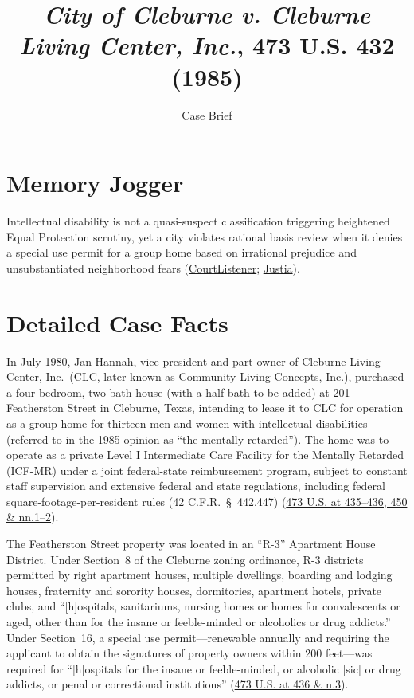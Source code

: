 \documentclass[12pt]{article}
\title{\textit{City of Cleburne v. Cleburne Living Center, Inc.}, 473 U.S. 432 (1985)}
\subtitle{Case Brief}
\author{}
\date{}
\begin{document}
\maketitle

\section{Memory Jogger}

Intellectual disability is not a quasi-suspect classification triggering heightened Equal Protection scrutiny, yet a city violates rational basis review when it denies a special use permit for a group home based on irrational prejudice and unsubstantiated neighborhood fears (\href{https://www.courtlistener.com/opinion/111507/city-of-cleburne-v-cleburne-living-center-inc/}{CourtListener}; \href{https://supreme.justia.com/cases/federal/us/473/432/}{Justia}).

\section{Detailed Case Facts}

In July 1980, Jan Hannah, vice president and part owner of Cleburne Living Center, Inc.\ (CLC, later known as Community Living Concepts, Inc.), purchased a four-bedroom, two-bath house (with a half bath to be added) at 201 Featherston Street in Cleburne, Texas, intending to lease it to CLC for operation as a group home for thirteen men and women with intellectual disabilities (referred to in the 1985 opinion as ``the mentally retarded''). The home was to operate as a private Level I Intermediate Care Facility for the Mentally Retarded (ICF-MR) under a joint federal-state reimbursement program, subject to constant staff supervision and extensive federal and state regulations, including federal square-footage-per-resident rules (42 C.F.R.\ \S~442.447) (\href{https://supreme.justia.com/cases/federal/us/473/432/}{473 U.S. at 435--436, 450 \& nn.1--2}).

The Featherston Street property was located in an ``R-3'' Apartment House District. Under Section~8 of the Cleburne zoning ordinance, R-3 districts permitted by right apartment houses, multiple dwellings, boarding and lodging houses, fraternity and sorority houses, dormitories, apartment hotels, private clubs, and ``[h]ospitals, sanitariums, nursing homes or homes for convalescents or aged, other than for the insane or feeble-minded or alcoholics or drug addicts.'' Under Section~16, a special use permit---renewable annually and requiring the applicant to obtain the signatures of property owners within 200 feet---was required for ``[h]ospitals for the insane or feeble-minded, or alcoholic [sic] or drug addicts, or penal or correctional institutions'' (\href{https://supreme.justia.com/cases/federal/us/473/432/}{473 U.S. at 436 \& n.3}).
\end{document}
